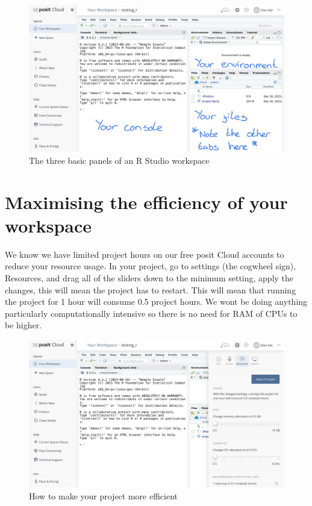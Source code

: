 \documentclass[
]{book}
\begin{document}
\begin{figure}
\includegraphics[width=0.9\linewidth]{figures/posit4} \caption{The three basic panels of an R Studio workspace}\label{fig:unnamed-chunk-4}
\end{figure}

\hypertarget{maximising-the-efficiency-of-your-workspace}{%
\section{Maximising the efficiency of your workspace}\label{maximising-the-efficiency-of-your-workspace}}

We know we have limited project hours on our free posit Cloud accounts to reduce your resource usage. In your project, go to settings (the cogwheel sign), Resources, and drag all of the sliders down to the minimum setting, apply the changes, this will mean the project has to restart. This will mean that running the project for 1 hour will consume 0.5 project hours. We wont be doing anything particularly computationally intensive so there is no need for RAM of CPUs to be higher.

\begin{figure}
\includegraphics[width=0.9\linewidth]{figures/posit5} \caption{How to make your project more efficient}\label{fig:unnamed-chunk-5}
\end{figure}
\end{document}
